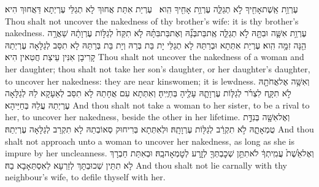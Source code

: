 {עֶרְוַ֥ת אֵֽשֶׁת\maqqaf אָחִ֖יךָ לֹ֣א תְגַלֵּ֑ה עֶרְוַ֥ת אָחִ֖יךָ הִֽוא׃ \setuma }
{עֶרְיַת אִתַּת אֲחוּךְ לָא תְגַלֵּי עֶרְיְתָא דַּאֲחוּךְ הִיא׃}
{Thou shalt not uncover the nakedness of thy brother’s wife: it is thy brother’s nakedness.}{}
{עֶרְוַ֥ת אִשָּׁ֛ה וּבִתָּ֖הּ לֹ֣א תְגַלֵּ֑ה אֶֽת\maqqaf בַּת\maqqaf בְּנָ֞הּ וְאֶת\maqqaf בַּת\maqqaf בִּתָּ֗הּ לֹ֤א תִקַּח֙ לְגַלּ֣וֹת עֶרְוָתָ֔הּ שַׁאֲרָ֥ה הֵ֖נָּה זִמָּ֥ה הִֽוא׃}
{עֶרְיַת אִתְּתָא וּבְרַתַּהּ לָא תְגַלֵּי יָת בַּת בְּרַהּ וְיָת בַּת בְּרַתַּהּ לָא תִסַּב לְגַלָּאָה עֶרְיְתַהּ קָרִיבָן אִנִּין עֵיצַת חֲטִאין הִיא׃}
{Thou shalt not uncover the nakedness of a woman and her daughter; thou shalt not take her son’s daughter, or her daughter’s daughter, to uncover her nakedness: they are near kinswomen; it is lewdness.}{}
{וְאִשָּׁ֥ה אֶל\maqqaf אֲחֹתָ֖הּ לֹ֣א תִקָּ֑ח לִצְרֹ֗ר לְגַלּ֧וֹת עֶרְוָתָ֛הּ עָלֶ֖יהָ בְּחַיֶּֽיהָ׃}
{וְאִתְּתָא עִם אֲחָתַהּ לָא תִסַּב לְאַעָקָא לַהּ לְגַלָּאָה עֶרְיְתַהּ עֲלַהּ בְּחַיַּיהָא׃}
{And thou shalt not take a woman to her sister, to be a rival to her, to uncover her nakedness, beside the other in her lifetime.}{}
{וְאֶל\maqqaf אִשָּׁ֖ה בְּנִדַּ֣ת טֻמְאָתָ֑הּ לֹ֣א תִקְרַ֔ב לְגַלּ֖וֹת עֶרְוָתָֽהּ׃}
{וּלְאִתְּתָא בְּרִיחוּק סְאוֹבְתַהּ לָא תִקְרַב לְגַלָּאָה עֶרְיְתַהּ׃}
{And thou shalt not approach unto a woman to uncover her nakedness, as long as she is impure by her uncleanness.}{}
{וְאֶל\maqqaf אֵ֙שֶׁת֙ עֲמִֽיתְךָ֔ לֹא\maqqaf תִתֵּ֥ן שְׁכׇבְתְּךָ֖ לְזָ֑רַע לְטׇמְאָה\maqqaf בָֽהּ׃}
{וּבְאִתַּת חַבְרָךְ לָא תִתֵּין שְׁכוּבְתָּךְ לְזַרְעָא לְאִסְתַּאָבָא בַהּ׃}
{And thou shalt not lie carnally with thy neighbour’s wife, to defile thyself with her.}{}

